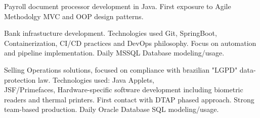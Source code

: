 \documentclass[10pt,a4paper,ragged2e]{altacv}
\begin{document}

\begin{fullwidth}
\makecvheader
\end{fullwidth}



Payroll document processor development in Java. First exposure to Agile Methodolgy MVC and OOP design patterns.

\divider

Bank infrastucture development. Technologies used Git, SpringBoot, Containerization, CI/CD practices and DevOps philosophy. Focus on automation and pipeline implementation. Daily MSSQL Database modeling/usage.

\divider

Selling Operations solutions, focused on compliance with brazilian "LGPD" data-protection law. Technologies used: Java Applets,\\ JSF/Primefaces, Hardware-specific software development including biometric readers and thermal printers. First contact with DTAP phased approach. Strong team-based production. Daily Oracle Database SQL modeling/usage.
\end{document}
